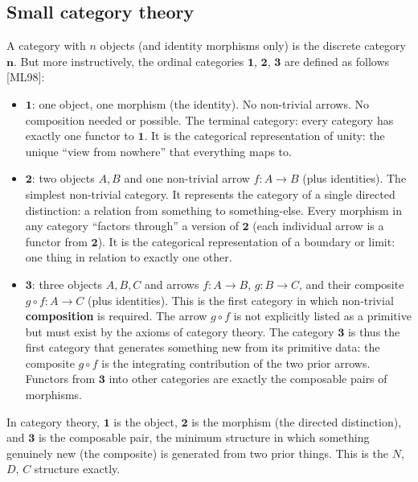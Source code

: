 \documentclass[12pt]{article}
\begin{document}
\subsection{Small category theory}\label{small-category-theory}

A category with \(n\) objects (and identity morphisms only) is the
discrete category \(\mathbf{n}\). But more instructively, the ordinal
categories \(\mathbf{1}\), \(\mathbf{2}\), \(\mathbf{3}\) are defined as
follows {[}ML98{]}:

\begin{itemize}
\item
  \(\mathbf{1}\): one object, one morphism (the identity). No
  non-trivial arrows. No composition needed or possible. The terminal
  category: every category has exactly one functor to \(\mathbf{1}\). It
  is the categorical representation of unity: the unique ``view from
  nowhere'' that everything maps to.
\item
  \(\mathbf{2}\): two objects \(A, B\) and one non-trivial arrow
  \(f: A \to B\) (plus identities). The simplest non-trivial category.
  It represents the category of a single directed distinction: a
  relation from something to something-else. Every morphism in any
  category ``factors through'' a version of \(\mathbf{2}\) (each
  individual arrow is a functor from \(\mathbf{2}\)). It is the
  categorical representation of a boundary or limit: one thing in
  relation to exactly one other.
\item
  \(\mathbf{3}\): three objects \(A, B, C\) and arrows \(f: A \to B\),
  \(g: B \to C\), and their composite \(g \circ f: A \to C\) (plus
  identities). This is the first category in which non-trivial
  \textbf{composition} is required. The arrow \(g \circ f\) is not
  explicitly listed as a primitive but must exist by the axioms of
  category theory. The category \(\mathbf{3}\) is thus the first
  category that generates something new from its primitive data: the
  composite \(g \circ f\) is the integrating contribution of the two
  prior arrows. Functors from \(\mathbf{3}\) into other categories are
  exactly the composable pairs of morphisms.
\end{itemize}

In category theory, \(\mathbf{1}\) is the object, \(\mathbf{2}\) is the
morphism (the directed distinction), and \(\mathbf{3}\) is the
composable pair, the minimum structure in which something genuinely new
(the composite) is generated from two prior things. This is the \(N\),
\(D\), \(C\) structure exactly.
\end{document}
